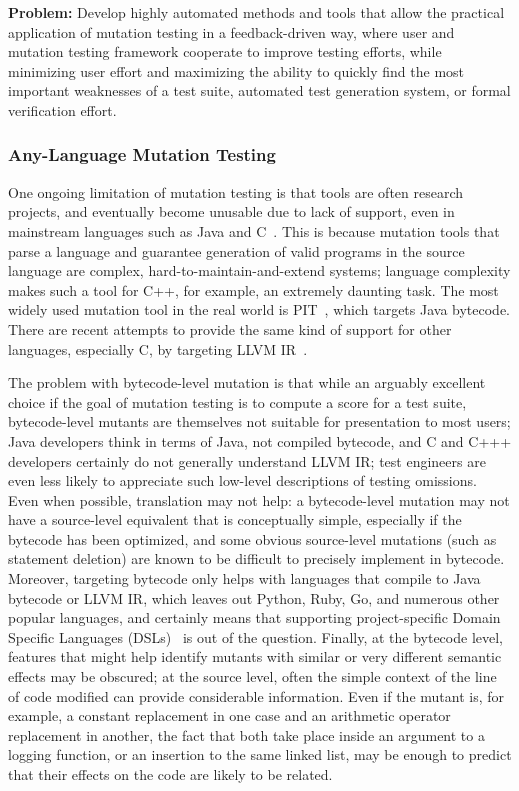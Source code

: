 \begin{framed}
{\bf Problem:}  Develop highly automated methods and tools that allow the practical application of mutation testing in a feedback-driven way, where user and mutation testing framework cooperate to improve testing efforts, while minimizing user effort and maximizing the ability to quickly find the most important weaknesses of a test suite, automated test generation system, or formal verification effort.
\end{framed}

\subsubsection{Any-Language Mutation Testing}

One ongoing limitation of mutation testing is that tools are often research projects, and eventually become unusable due to lack of support, even in mainstream languages such as Java and C~\cite{MutChoice}.  This is because mutation tools that parse a language and guarantee generation of valid programs in the source language are complex, hard-to-maintain-and-extend systems; language complexity makes such a tool for C++, for example, an extremely daunting task.  The most widely used mutation tool in the real world is PIT~\cite{pittest}, which targets Java bytecode.  There are recent attempts to provide the same kind of support for other languages, especially C, by targeting LLVM IR~\cite{HaririLLVM}.

The problem with bytecode-level mutation is that while an arguably excellent choice if the goal of mutation testing is to compute a score for a test suite, bytecode-level mutants are themselves not suitable for presentation to most users; Java developers think in terms of Java, not compiled bytecode, and C and C+++ developers certainly do not generally understand LLVM IR; test engineers are even less likely to appreciate such low-level descriptions of testing omissions.  Even when possible, translation may not help: a bytecode-level mutation may not have a source-level equivalent that is conceptually simple, especially if the bytecode has been optimized, and some obvious source-level mutations (such as statement deletion) are known to be difficult to precisely implement in bytecode.  Moreover, targeting bytecode only helps with languages that compile to Java bytecode or LLVM IR, which leaves out Python, Ruby, Go, and numerous other popular languages, and certainly means that supporting project-specific Domain Specific Languages (DSLs)~\cite{Fow10} is out of the question.  Finally, at the bytecode level, features that might help identify mutants with similar or very different semantic effects may be obscured; at the source level, often the simple context of the line of code modified can provide considerable information.  Even if the mutant is, for example, a constant replacement in one case and an arithmetic operator replacement in another, the fact that both take place inside an argument to a logging function, or an insertion to the same linked list, may be enough to predict that their effects on the code are likely to be related.


